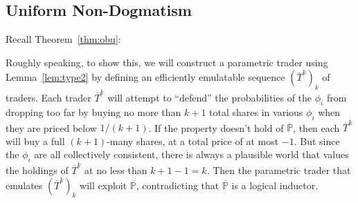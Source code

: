 \documentclass[authordate,onecolumn,noenvironments]{miri-tech-article}
\numberwithin{equation}{subsection}
\newcommand{\seq}[1]{{\overline{#1}}}
\newcommand{\li}{logical inductor}
\newcommand{\trade}{T}%
\newcommand{\Trader}{\seq{\trade}} %
\newcommand{\BelState}{\mathbb{P}}
\newcommand{\pt}{\BelState}
\newcommand{\MP}{\seq{\pt}}
\begin{document}








\subsection{Uniform Non-Dogmatism}\label{app:obu}
Recall Theorem~\ref{thm:obu}:

\restateunondog*

%
Roughly speaking, to show this, 
we will construct a parametric trader using Lemma~\ref{lem:type2}  by defining  an efficiently emulatable sequence $(\Trader^k)_k$ of traders.
Each trader $\Trader^k$ will attempt to ``defend'' the probabilities of the $\phi_i$ from dropping too far by buying no more than $k+1$ total shares in various
$\phi_i$ when they are priced below $1/(k+1)$.  If the property doesn't hold of $\MP$, then each $\Trader^k$ will buy a full $(k+1)$-many shares, at a total price of at most
$-1$. But since the $\phi_i$ are all collectively consistent, there is always a plausible world that values the holdings of $\Trader^k$ at no less than
$k+1-1=k$. Then the parametric trader that emulates  $(\Trader^k)_k$ will exploit $\MP$, contradicting that $\MP$ is a \li{}.
\end{document}
